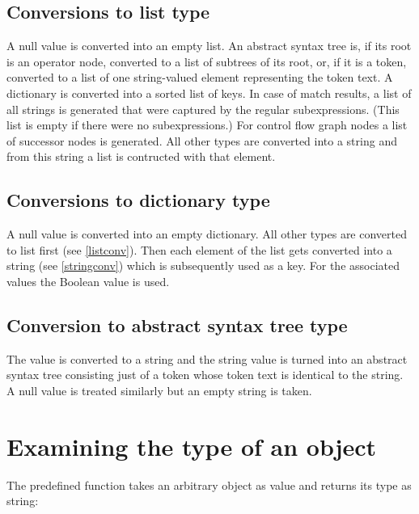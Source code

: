 \subsection{Conversions to list type}

\label{listconv}
A null value is converted into an empty list. An abstract syntax tree
is, if its root is an operator node, converted to a list of subtrees of
its root, or, if it is a token, converted to a list of one string-valued
element representing the token text. A dictionary is converted into a
sorted list of keys. In case of match results, a list of all strings
is generated that were captured by the regular subexpressions. (This
list is empty if there were no subexpressions.) For control flow graph
nodes a list of successor nodes is generated. All other types are
converted into a string and from this string a list is contructed with
that element.

\subsection{Conversions to dictionary type}

\label{dictconv}
A null value is converted into an empty dictionary. All other
types are converted to list first (see \ref{listconv}). Then
each element of the list gets converted into a string
(see \ref{stringconv}) which is subsequently used as a key.
For the associated values the Boolean value  is used.

\subsection{Conversion to abstract syntax tree type}

\label{treeconv}
The value is converted to a string and the string value is turned
into an abstract syntax tree consisting just of a token whose
token text is identical to the string. A null value is treated
similarly but an empty string is taken.

\section{Examining the type of an object}

The predefined function  takes an arbitrary object as
value and returns its type as string:

